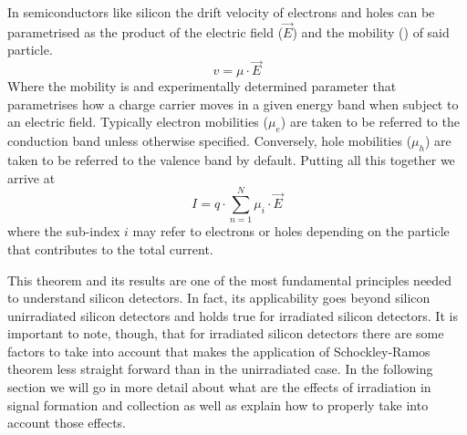 In semiconductors like silicon the drift velocity of electrons and holes can be parametrised as the product of the electric field ($ \vec E $) and the mobility (\mu) of said particle.\[v = \mu \cdot \vec E\] Where the mobility is and experimentally determined parameter that parametrises how a charge carrier moves in a given energy band when subject to an electric field. Typically electron mobilities ($ \mu_e $) are taken to be referred to the conduction band unless otherwise specified. Conversely, hole mobilities ($ \mu_h $) are taken to be referred to the valence band by default. Putting all this together we arrive at
\begin{equation}
	I = q \cdot \sum_{n=1}^{N} \mu_i \cdot \vec{E} 
\label{eq:ramoMob}
\end{equation}
where the sub-index $i$ may refer to electrons or holes depending on the particle that contributes to the total current.

This theorem and its results are one of the most fundamental principles needed to understand silicon detectors. In fact, its applicability goes beyond silicon unirradiated silicon detectors and holds true for irradiated silicon detectors. It is important to note, though, that for irradiated silicon detectors there are some factors to take into account that makes the application of Schockley-Ramos theorem less straight forward than in the unirradiated case. In the following section we will go in more detail about what are the effects of irradiation in signal formation and collection as well as explain how to properly take into account those effects.
